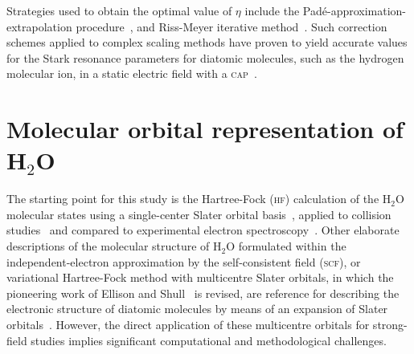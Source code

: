 Strategies used to obtain the optimal value of $\eta$ include the
Pad\'{e}-approximation-extrapolation
procedure~\cite{Moiseyev_Pade_2005}, and Riss-Meyer iterative
method~\cite{RissMeyer_1993}. Such correction schemes applied to
complex scaling methods have proven to yield accurate values for the
Stark resonance parameters for diatomic molecules, such as the
hydrogen molecular ion, in a static electric field with a
\textsc{cap}~\cite{Tsog_2013}.
  








\section{Molecular orbital representation of H$_{2}$O}
\label{ch:h2o_structure}

The starting point for this study is the Hartree-Fock (\textsc{hf})
calculation of the H$_{2}$O molecular states using a single-center
Slater orbital
basis~\cite{Moccia_1964,Moccia_JCP_2164,Moccia_JCP_2176}, applied to
collision studies~\cite{Montanari_2013} and compared to experimental
electron spectroscopy~\cite{Hafied_2007}. Other elaborate descriptions
of the molecular structure of H$_{2}$O formulated within the
independent-electron approximation by the self-consistent field
(\textsc{scf}), or variational Hartree-Fock method with multicentre
Slater orbitals, in which the pioneering work of Ellison and
Shull~\cite{EllisonShullh2o_1955} is revised, are reference for
describing the electronic structure of diatomic molecules by means of
an expansion of Slater
orbitals~\cite{Pitzer_1968,Pitzer_1970}. However, the direct
application of these multicentre orbitals for strong-field studies
implies significant computational and methodological challenges.

